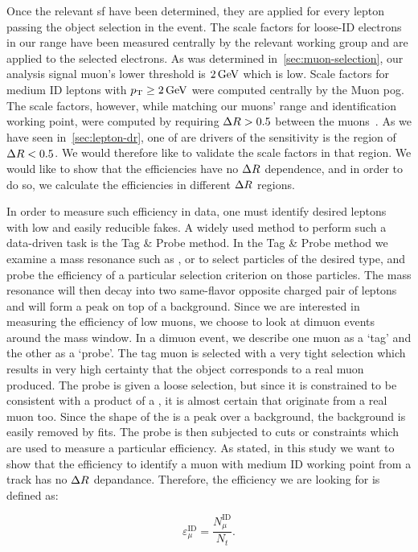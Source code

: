 Once the relevant \gls{sf} have been determined, they are applied for every lepton passing the object selection in the event. The scale factors for loose-ID electrons in our \pt range have been measured centrally by the relevant working group and are applied to the selected electrons. As was determined in~\ref{sec:muon-selection}, our analysis signal muon's lower \pt threshold is $2\,\text{Ge\hspace{-.08em}V}$ which is low. Scale factors for medium ID leptons with $p_{\mathrm{T}}\geq 2\,\text{Ge\hspace{-.08em}V}$ were computed centrally by the Muon \gls{pog}. The scale factors, however, while matching our muons' \pt range and identification working point, were computed by requiring $\Delta R > 0.5$  between the muons~\cite{muon-id-sf-2016,muon-id-sf-2016-pres}. As we have seen in~\ref{sec:lepton-dr}, one of are drivers of the sensitivity is the region of $\Delta R < 0.5$. We would therefore like to validate the scale factors in that region. We would like to show that the efficiencies have no $\Delta R$ dependence, and in order to do so, we calculate the efficiencies in different $\Delta R$ regions.

In order to measure such efficiency in data, one must identify desired leptons with low and easily reducible fakes. A widely used method to perform such a data-driven task is the Tag \& Probe method. In the Tag \& Probe method we examine a mass resonance such as \PZ, \JPsi or \PGU to select particles of the desired type, and probe the efficiency of a particular selection criterion on those particles. The mass resonance will then decay into two same-flavor opposite charged pair of leptons and will form a peak on top of a background. Since we are interested in measuring the efficiency of low \pt muons, we choose to look at dimuon events around the \JPsi mass window. In a dimuon event, we describe one muon as a `tag' and the other as a `probe'. The tag muon is selected with a very tight selection which results in very high certainty that the object corresponds to a real muon produced. The probe is given a loose selection, but since it is constrained to be consistent with a product of a \JPsi, it is almost certain that originate from a real muon too. Since the shape of the \JPsi is a peak over a background, the background is easily removed by fits. The probe is then subjected to cuts or constraints which are used to measure a particular efficiency. As stated, in this study we want to show that the efficiency to identify a muon with medium ID working point from a track has no $\Delta R$ depandance. Therefore, the efficiency we are looking for is defined as:

\begin{equation}
\varepsilon_{\mu}^{\mathrm{ID}} = \frac{N_{\mu}^\mathrm{ID}}{N_{t}}.
\end{equation}

